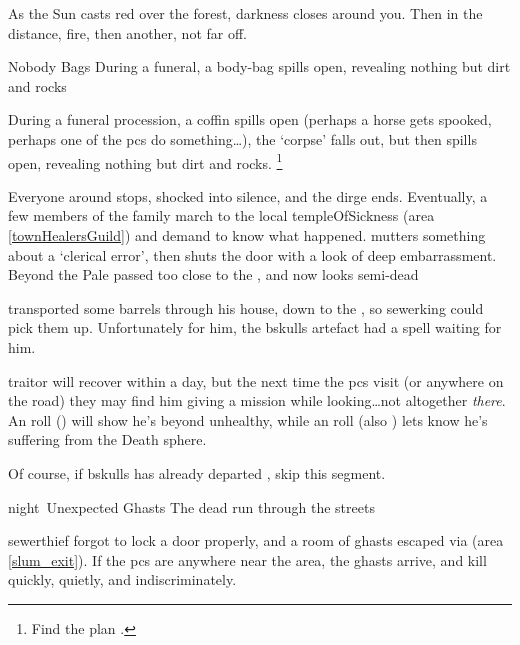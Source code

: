 \begin{boxtext}
  As the Sun casts red over the forest, darkness closes around you.
  Then in the distance, fire, then another, not far off.
\end{boxtext}

  {Nobody Bags}%
  {During a funeral, a body-bag spills open, revealing nothing but dirt and rocks}%
  \label{sewerPt2}

During a funeral procession, a coffin spills open (perhaps a horse gets spooked, perhaps one of the \glspl{pc} do something\ldots), the `corpse' falls out, but then spills open, revealing nothing but dirt and rocks.%
\footnote{Find the plan .}

Everyone around stops, shocked into silence, and the dirge ends.
Eventually, a few members of the family march to the local \gls{templeOfSickness} (area \vref{townHealersGuild}) and demand to know what happened.
 mutters something about a `clerical error', then shuts the door with a look of deep embarrassment.
  {Beyond the Pale}%
  { passed too close to the , and now looks semi-dead}%

\begin{exampletext}
   transported some barrels through his house, down to the , so \gls{sewerking} could pick them up.
  Unfortunately for him, the \gls{bskulls} \gls{artefact} had a spell waiting for him.
\end{exampletext}

\Gls{traitor} will recover within a day, but the next time the \glspl{pc} visit  (or anywhere on the road) they may find him giving a mission while looking\ldots not altogether \textit{there}.
An  roll (\tn[8]) will show he's beyond unhealthy, while an  roll (also \tn[8]) lets  know he's suffering from the Death \gls{sphere}.

Of course, if \gls{bskulls} has already departed , skip this \gls{segment}.

{\gls{night}~Unexpected Ghasts}%
{The dead run through the streets}%

\Gls{sewerthief} forgot to lock a door properly, and a room of ghasts escaped via  (area \vref{slum_exit}).
If the \glspl{pc} are anywhere near the area, the ghasts arrive, and kill quickly, quietly, and indiscriminately.

